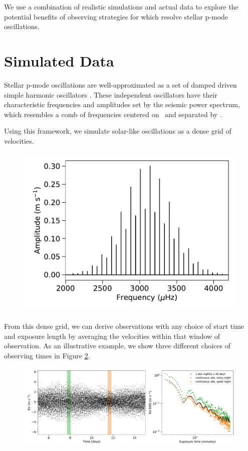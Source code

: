 \documentclass[modern]{aastex62}
\begin{document}
We use a combination of realistic simulations and actual \EXPRES data to explore the potential benefits of observing strategies for \EPRV which resolve stellar p-mode oscillations. 


\section{Simulated Data}

Stellar p-mode oscillations are well-approximated as a set of damped driven simple harmonic oscillators . 
These independent oscillators have their characteristic frequencies and amplitudes set by the seismic power spectrum, which resembles a comb of frequencies centered on \numax\ and separated by \deltanu.

Using this framework, we simulate solar-like oscillations as a dense grid of velocities. 

\begin{figure}
    \centering
    \includegraphics[width=0.7\linewidth]{paper/figures/sim_freq_spectrum.pdf}
    \caption{}
    \label{fig:sim-freq-spectrum}
\end{figure}

From this dense grid, we can derive \RV observations with any choice of start time and exposure length by averaging the velocities within that window of observation. 
As an illustrative example, we show three different choices of observing times in Figure \ref{fig:binning-sim}. 

\begin{figure}
    \centering
    \includegraphics[width=0.9\linewidth]{figures/binning_test.pdf}
    \caption{}
    \label{fig:binning-sim}
\end{figure}
\end{document}
